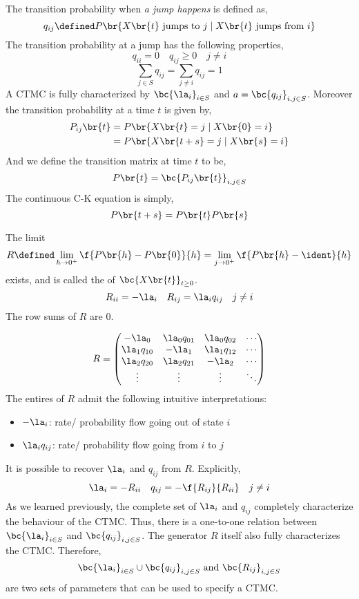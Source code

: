 \documentclass{article}
\begin{document}
    The transition probability when \textit{a jump happens} is defined as,
    \[ q_{ij} \defined P\br{X\br{t} \text{ jumps to } j \mid X\br{t} \text{ jumps from } i} \]
    The transition probability at a jump has the following properties,
    \[ q_{ii} = 0 \quad q_{ij} \geq 0 \quad j\neq i \]
    \[ \sum_{j \in S}q_{ij} = \sum_{j \neq i} q_{ij} = 1 \]
    A CTMC is fully characterized by $\bc{\la_i}_{i \in S}$ and $a = \bc{q_{ij}}_{i,j \in S}$. Moreover the transition probability at a time $t$ is given by,
    \begin{align*}
        P_{ij}\br{t}
        &= P\br{X\br{t} = j \mid X\br{0} = i} \\
        &= P\br{X\br{t+s} = j \mid X\br{s} = i}
    \end{align*}
    And we define the transition matrix at time $t$ to be,
    \[ P\br{t} = \bc{P_{ij}\br{t}}_{i,j \in S} \]
    The continuous C-K equation is simply,
    \[ P\br{t+s} = P\br{t}P\br{s} \]
    \begin{definition}
        The limit
        \[ R \defined \lim_{h \to 0^{+}} \f{P\br{h} - P\br{0}}{h} = \lim_{j \to 0^+} \f{P\br{h} - \ident}{h} \]
        exists, and is called the  of $\bc{X\br{t}}_{t \geq 0}$.
        \[ R_{ii} = - \la_{i} \quad R_{ij} = \la_i q_{ij} \quad j \neq i \]
        The row sums of $R$ are $0$.
    \end{definition}
    \[ R = \begin{pmatrix}
        -\la_0 & \la_0 q_{01} & \la_0 q_{02} & \cdots \\
        \la_1q_{10} & -\la_{1} & \la_1q_{12} & \cdots \\
        \la_2q_{20} & \la_2q_{21} & -\la_2 & \cdots \\
        \vdots & \vdots & \vdots & \ddots \\
    \end{pmatrix} \]
    The entires of $R$ admit the following intuitive interpretations:
    \begin{itemize}
        \item $-\la_i$: rate/ probability flow going out of state $i$
        \item $\la_i q_{ij}$: rate/ probability flow going from $i$ to $j$
    \end{itemize}
    It is possible to recover $\la_i$ and $q_{ij}$ from $R$. Explicitly,
    \[ \la_i = - R_{ii} \quad q_{ij} = -\f{R_{ij}}{R_{ii}} \quad j \neq i \]
    As we learned previously, the complete set of $\la_i$ and $q_{ij}$ completely characterize the behaviour of the CTMC. Thus, there is a one-to-one relation between $\bc{\la_i}_{i \in S}$ and $\bc{q_{ij}}_{i,j \in S}$. The generator $R$ itself also fully characterizes the CTMC. Therefore,
    \[ \bc{\la_i}_{i \in S} \cup \bc{q_{ij}}_{i,j \in S} \text{ and } \bc{R_{ij}}_{i,j \in S}\]
    are two sets of parameters that can be used to specify a CTMC.
\end{document}
